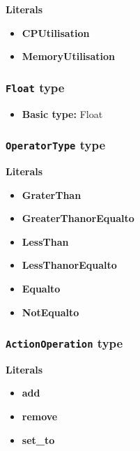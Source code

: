 \textbf{Literals}
\begin{itemize}
\item \textbf{CPUtilisation} 
\end{itemize}
\begin{itemize}
\item \textbf{MemoryUtilisation} 
\end{itemize}

\subsubsection{\texttt{Float} type}

\begin{itemize}
\item \textbf{Basic type:} Float
\end{itemize}
\subsubsection{\texttt{OperatorType} type}

\textbf{Literals}
\begin{itemize}
\item \textbf{GraterThan} 
\end{itemize}
\begin{itemize}
\item \textbf{GreaterThanorEqualto} 
\end{itemize}
\begin{itemize}
\item \textbf{LessThan} 
\end{itemize}
\begin{itemize}
\item \textbf{LessThanorEqualto} 
\end{itemize}
\begin{itemize}
\item \textbf{Equalto} 
\end{itemize}
\begin{itemize}
\item \textbf{NotEqualto} 
\end{itemize}

\subsubsection{\texttt{ActionOperation} type}

\textbf{Literals}
\begin{itemize}
\item \textbf{add} 
\end{itemize}
\begin{itemize}
\item \textbf{remove} 
\end{itemize}
\begin{itemize}
\item \textbf{set\_to} 
\end{itemize}

